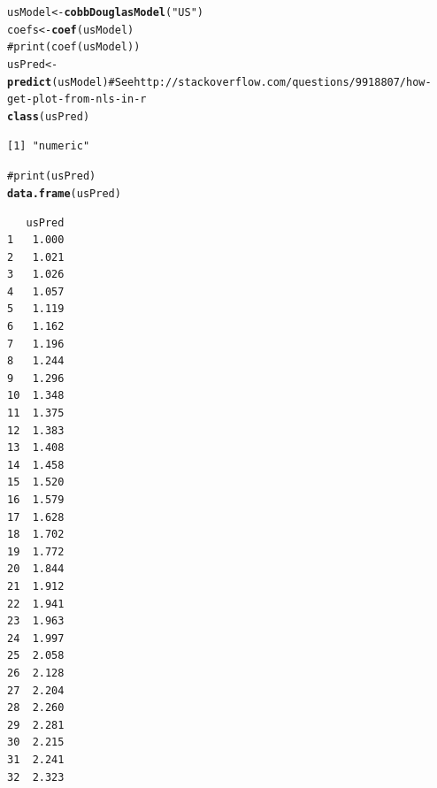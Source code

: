 \documentclass[preprint,authoryear,12pt]{elsarticle}\usepackage{graphicx, color}
\makeatletter
\newcommand{\hlfunctioncall}[1]{\textcolor[rgb]{0.501960784313725,0,0.329411764705882}{\textbf{#1}}}%
\newcommand{\hlstring}[1]{\textcolor[rgb]{0.6,0.6,1}{#1}}%
\newcommand{\hlcomment}[1]{\textcolor[rgb]{0.180392156862745,0.6,0.341176470588235}{#1}}%
\newenvironment{kframe}{%
 \def\at@end@of@kframe{}%
 \ifinner\ifhmode%
  \def\at@end@of@kframe{\end{minipage}}%
  \begin{minipage}{\columnwidth}%
 \fi\fi%
 \def\FrameCommand##1{\hskip\@totalleftmargin \hskip-\fboxsep
 \colorbox{shadecolor}{##1}\hskip-\fboxsep
     \hskip-\linewidth \hskip-\@totalleftmargin \hskip\columnwidth}%
 \MakeFramed {\advance\hsize-\width
   \@totalleftmargin\z@ \linewidth\hsize
   \@setminipage}}%
 {\par\unskip\endMakeFramed%
 \at@end@of@kframe}
\newenvironment{knitrout}{}{} %
\makeatother
\begin{document}
\begin{knitrout}
\color{fgcolor}\begin{kframe}
\begin{alltt}
usModel <- \hlfunctioncall{cobbDouglasModel}(\hlstring{"US"})
coefs <- \hlfunctioncall{coef}(usModel)
\hlcomment{# print(coef(usModel))}
usPred <- \hlfunctioncall{predict}(usModel) \hlcomment{#See http://stackoverflow.com/questions/9918807/how-get-plot-from-nls-in-r}
\hlfunctioncall{class}(usPred)
\end{alltt}
\begin{verbatim}
[1] "numeric"
\end{verbatim}
\begin{alltt}
\hlcomment{#print(usPred)}
\hlfunctioncall{data.frame}(usPred)
\end{alltt}
\begin{verbatim}
   usPred
1   1.000
2   1.021
3   1.026
4   1.057
5   1.119
6   1.162
7   1.196
8   1.244
9   1.296
10  1.348
11  1.375
12  1.383
13  1.408
14  1.458
15  1.520
16  1.579
17  1.628
18  1.702
19  1.772
20  1.844
21  1.912
22  1.941
23  1.963
24  1.997
25  2.058
26  2.128
27  2.204
28  2.260
29  2.281
30  2.215
31  2.241
32  2.323
\end{verbatim}
\begin{alltt}


\end{alltt}
\end{kframe}
\end{knitrout}
\end{document}
